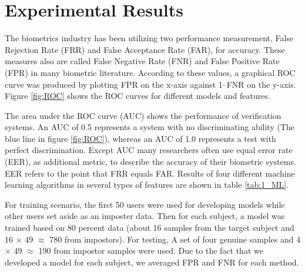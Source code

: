 


 

\section{Experimental Results}

The biometrics industry has been utilizing two performance measurement, False Rejection Rate (FRR) and False Acceptance Rate (FAR), for accuracy. These measures also are called False Negative Rate (FNR) and False Positive Rate (FPR) in many biometric literature. According to these values, a graphical ROC curve was produced by plotting FPR on the x-axis against 1–FNR on the y-axis. Figure \ref{fig:ROC} shows the ROC curves for different models and features.  

The area under the ROC curve (AUC) shows the performance of verification systems. An AUC of 0.5 represents a system with no discriminating ability (The blue line in figure \ref{fig:ROC}), whereas an AUC of 1.0 represents a test with perfect discrimination. Except AUC many researchers often use equal error rate (EER), as additional metric, to describe the accuracy of their biometric systems. EER refers to the point that FRR equals FAR. Results of four different machine learning algorithms in several types of features are shown in table \ref{tab:1_ML}.


For training scenario, the first 50 users were used for developing models while other users set aside as an imposter data. Then for each subject, a model was trained based on 80 percent data (about 16 samples from the target subject and 16 $\times$ 49 $\approx$ 780 from impostors). For testing, A set of four genuine samples and 4 $\times$ 49 $\approx$ 190 from impostor samples were used. Due to the fact that we developed a model for each subject, we averaged FPR and FNR for each method.

